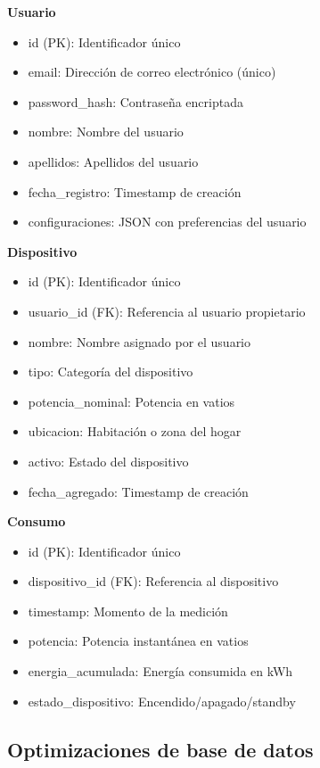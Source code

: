\textbf{Usuario}
\begin{itemize}
    \item id (PK): Identificador único
    \item email: Dirección de correo electrónico (único)
    \item password\_hash: Contraseña encriptada
    \item nombre: Nombre del usuario
    \item apellidos: Apellidos del usuario
    \item fecha\_registro: Timestamp de creación
    \item configuraciones: JSON con preferencias del usuario
\end{itemize}

\textbf{Dispositivo}
\begin{itemize}
    \item id (PK): Identificador único
    \item usuario\_id (FK): Referencia al usuario propietario
    \item nombre: Nombre asignado por el usuario
    \item tipo: Categoría del dispositivo
    \item potencia\_nominal: Potencia en vatios
    \item ubicacion: Habitación o zona del hogar
    \item activo: Estado del dispositivo
    \item fecha\_agregado: Timestamp de creación
\end{itemize}

\textbf{Consumo}
\begin{itemize}
    \item id (PK): Identificador único
    \item dispositivo\_id (FK): Referencia al dispositivo
    \item timestamp: Momento de la medición
    \item potencia: Potencia instantánea en vatios
    \item energia\_acumulada: Energía consumida en kWh
    \item estado\_dispositivo: Encendido/apagado/standby
\end{itemize}

\subsection{Optimizaciones de base de datos}

